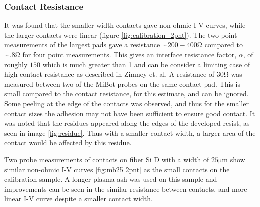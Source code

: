 \subsubsection{Contact Resistance}
It was found that the smaller width contacts gave non-ohmic I-V curves, while the larger contacts were linear (figure \ref{fig:calibration_2pnt}). The two point measurements of the largest pads gave a resistance $\sim 200-400 \si{\ohm}$ compared to  $\sim .8 \si{\ohm}$ for four point measurements. This gives an interface resistance factor, $\alpha$, of roughly $150$ which is much greater than 1 and can be consider a limiting case of high contact resistance as described in Zimney et. al. %
A resistance of $30 \si{\ohm}$ was measured between two of the MiBot probes on the same contact pad. This is small compared to the contact resistance, for this estimate, and can be ignored. Some peeling at the edge of the contacts was observed, and thus for the smaller contact sizes the adhesion may not have been sufficient to ensure good contact. It was noted that the residues appeared along the edges of the developed resist, as seen in image \ref{fig:residue}. Thus with a smaller contact width, a larger area of the contact would be affected by this residue. 

Two probe measurements of contacts on fiber Si D with a width of $ 25 \si{\micro\meter}$ show similar non-ohmic I-V curves \ref{fig:mb25 2pnt} as the small contacts on the calibration sample. A longer plasma ash was used on this sample and improvements can be seen in the similar resistance between contacts, and more linear I-V curve despite a smaller contact width.  


